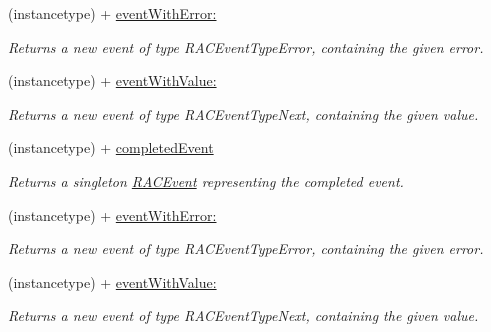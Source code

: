 \begin{DoxyCompactItemize}
\mbox{\label{interface_r_a_c_event_aaebc908a1477a8d79d85a81101beaee7}} 
(instancetype) + \mbox{\hyperlink{interface_r_a_c_event_aaebc908a1477a8d79d85a81101beaee7}{event\+With\+Error\+:}}
\begin{DoxyCompactList}\small\item\em Returns a new event of type R\+A\+C\+Event\+Type\+Error, containing the given error. \end{DoxyCompactList}\item 
\mbox{\label{interface_r_a_c_event_aac79397e437b0a76901d41d38cc46791}} 
(instancetype) + \mbox{\hyperlink{interface_r_a_c_event_aac79397e437b0a76901d41d38cc46791}{event\+With\+Value\+:}}
\begin{DoxyCompactList}\small\item\em Returns a new event of type R\+A\+C\+Event\+Type\+Next, containing the given value. \end{DoxyCompactList}\item 
\mbox{\label{interface_r_a_c_event_a583e76d3b522a3657dfe9de8f53cacd0}} 
(instancetype) + \mbox{\hyperlink{interface_r_a_c_event_a583e76d3b522a3657dfe9de8f53cacd0}{completed\+Event}}
\begin{DoxyCompactList}\small\item\em Returns a singleton \mbox{\hyperlink{interface_r_a_c_event}{R\+A\+C\+Event}} representing the {\ttfamily completed} event. \end{DoxyCompactList}\item 
\mbox{\label{interface_r_a_c_event_aaebc908a1477a8d79d85a81101beaee7}} 
(instancetype) + \mbox{\hyperlink{interface_r_a_c_event_aaebc908a1477a8d79d85a81101beaee7}{event\+With\+Error\+:}}
\begin{DoxyCompactList}\small\item\em Returns a new event of type R\+A\+C\+Event\+Type\+Error, containing the given error. \end{DoxyCompactList}\item 
\mbox{\label{interface_r_a_c_event_aac79397e437b0a76901d41d38cc46791}} 
(instancetype) + \mbox{\hyperlink{interface_r_a_c_event_aac79397e437b0a76901d41d38cc46791}{event\+With\+Value\+:}}
\begin{DoxyCompactList}\small\item\em Returns a new event of type R\+A\+C\+Event\+Type\+Next, containing the given value. \end{DoxyCompactList}\end{DoxyCompactItemize}

